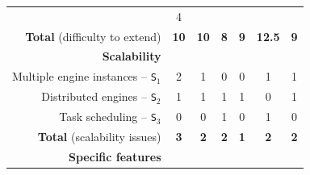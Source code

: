 \documentclass[preprint,3p,twocolumn]{elsarticle}
\begin{document}
\begin{table}
\begin{tabular}{rcccccc}
                                     & \cellcolor[HTML]{99DD99}4\\
  \textbf{Total} (difficulty to extend) & \cellcolor[HTML]{99D199}\textbf{10}
                                     & \cellcolor[HTML]{99D199}\textbf{10}
                                     & \cellcolor[HTML]{99FF99}\textbf{8}
                                     & \cellcolor[HTML]{99E899}\textbf{9}
                                     & \cellcolor[HTML]{999999}\textbf{12.5}
                                     & \cellcolor[HTML]{99E899}\textbf{9}\\
\cellcolor[HTML]{EEEEEE}\textbf{Scalability}& \multicolumn{6}{l}{\cellcolor[HTML]{EEEEEE}}\\
Multiple engine instances -- \texttt{S$_1$}& \cellcolor[HTML]{999999}2
                                     & \cellcolor[HTML]{99CC99}1
                                     & \cellcolor[HTML]{99FF99}0
                                     & \cellcolor[HTML]{99FF99}0
                                     & \cellcolor[HTML]{99CC99}1
                                     & \cellcolor[HTML]{99CC99}1\\
Distributed engines -- \texttt{S$_2$}& \cellcolor[HTML]{999999}1
                                     & \cellcolor[HTML]{999999}1
                                     & \cellcolor[HTML]{999999}1
                                     & \cellcolor[HTML]{999999}1
                                     & \cellcolor[HTML]{99FF99}0
                                     & \cellcolor[HTML]{999999}1\\
Task scheduling -- \texttt{S$_3$}    & \cellcolor[HTML]{99FF99}0
                                     & \cellcolor[HTML]{99FF99}0
                                     & \cellcolor[HTML]{999999}1
                                     & \cellcolor[HTML]{99FF99}0
                                     & \cellcolor[HTML]{999999}1
                                     & \cellcolor[HTML]{99FF99}0\\
\textbf{Total} (scalability issues)  & \cellcolor[HTML]{999999}\textbf{3}
                                     & \cellcolor[HTML]{99CC99}\textbf{2}
                                     & \cellcolor[HTML]{99CC99}\textbf{2}
                                     & \cellcolor[HTML]{99FF99}\textbf{1}
                                     & \cellcolor[HTML]{99CC99}\textbf{2}
                                     & \cellcolor[HTML]{99CC99}\textbf{2}\\
\cellcolor[HTML]{EEEEEE}\textbf{Specific features}& \multicolumn{6}{l}{\cellcolor[HTML]{EEEEEE}}\\

\end{tabular}
\end{table}
\end{document}
